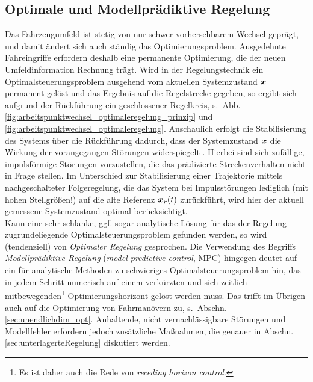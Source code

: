\subsection{Optimale und Modellprädiktive Regelung} \label{sec:def_modellpraediktive_Regelung}
Das Fahrzeugumfeld ist stetig von nur schwer vorhersehbarem Wechsel geprägt, und damit ändert sich auch ständig das Optimierungsproblem. Ausgedehnte Fahreingriffe erfordern deshalb eine permanente Optimierung, die der neuen Umfeldinformation Rechnung trägt. 
Wird in der Regelungstechnik ein Optimalsteuerungsproblem ausgehend vom aktuellen Systemzustand $\boldsymbol{x}$ permanent gelöst  
und das Ergebnis auf die Regelstrecke gegeben, so ergibt sich aufgrund der Rückführung ein geschlossener Regelkreis, s.\ Abb.\,\ref{fig:arbeitspunktwechsel_optimaleregelung_prinzip} und \ref{fig:arbeitspunktwechsel_optimaleregelung}. Anschaulich erfolgt die Stabilisierung des Systems über die Rückführung dadurch, dass der Systemzustand $\boldsymbol{x}$ die Wirkung der vorangegangen Störungen widerspiegelt \cite{foellingeroptimal}. Hierbei sind sich zufällige, impulsförmige Störungen vorzustellen, die das prädizierte Streckenverhalten nicht in Frage stellen. Im Unterschied zur Stabilisierung einer Trajektorie mittels nachgeschalteter Folgeregelung, die das System bei Impulsstörungen lediglich (mit hohen Stellgrößen!) auf die alte Referenz $\boldsymbol{x}_r(t)$ zurückführt, wird hier der aktuell gemessene Systemzustand optimal berücksichtigt. \\
Kann eine sehr schlanke, ggf. sogar analytische Lösung für das der Regelung zugrundeliegende Optimalsteuerungsproblem gefunden werden, so wird (tendenziell) von \emph{Optimaler Regelung}  \cite{foellingeroptimal} gesprochen. Die Verwendung des Begriffs \emph{Modellprädiktive Regelung} (\emph{model predictive control}, MPC) \cite{Findeisen2003} hingegen deutet auf ein für analytische Methoden zu schwieriges Optimalsteuerungsproblem hin, das in jedem Schritt numerisch auf einem verkürzten und sich zeitlich mitbewegenden\footnote{Es ist daher auch die Rede von \emph{receding horizon control}.} Optimierungshorizont gelöst werden muss. 
Das trifft im Übrigen auch auf die Optimierung von Fahrmanövern zu, s.\ Abschn.\,\ref{sec:unendlichdim_opt}. Anhaltende, nicht vernachlässigbare Störungen und Modellfehler erfordern jedoch zusätzliche Maßnahmen, die genauer in Abschn.\,\ref{sec:unterlagerteRegelung} 
diskutiert werden.




